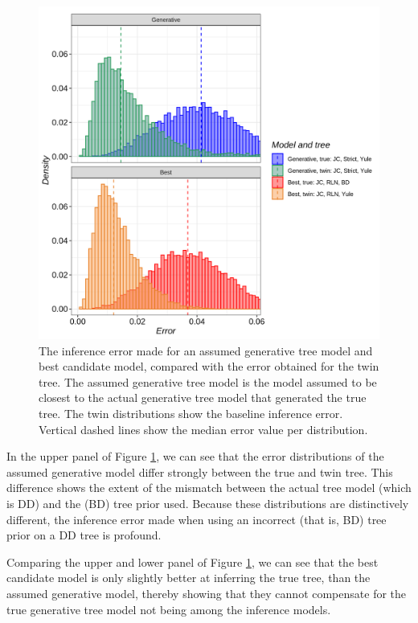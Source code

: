 \begin{figure}[H]
  \includegraphics[width=\textwidth]{pirouette_example_30/errors.png}
  \caption{
    The inference error made 
    for an assumed generative tree model and best candidate model,
    compared with the error obtained for the twin tree.
    The assumed generative tree model is the model assumed to be closest to
    the actual generative tree model that generated the true tree.
    The twin distributions show the baseline inference error.
    Vertical dashed lines show the median error value per distribution.
  }
  \label{fig:example_30}
\end{figure}

In the upper panel of Figure \ref{fig:example_30},
we can see that the error distributions of the assumed generative model
differ strongly between the true and twin tree. 
This difference shows the extent of the mismatch between
the actual tree model (which is DD) and the (BD) tree prior used.
Because these distributions are distinctively different,
the inference error made when using an 
incorrect (that is, BD) tree prior on a DD tree
is profound.

Comparing the upper and lower panel of Figure \ref{fig:example_30}, 
we can see that the best
candidate model is only slightly better at inferring the true tree,
than the assumed generative model, 
thereby showing that they cannot compensate 
for the true generative tree model not being among the inference models.

